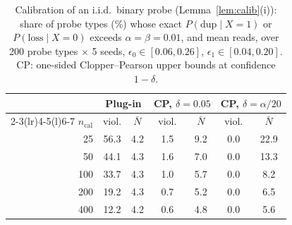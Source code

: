 \begin{table}[!htbp]
\centering
\caption{Calibration of an i.i.d.\ binary probe (Lemma~\ref{lem:calib}(i)): share of probe types (\%) whose exact $P(\mathrm{dup}\mid X{=}1)$ or
$P(\mathrm{loss}\mid X{=}0)$ exceeds $\alpha{=}\beta{=}0.01$, and mean reads, over 200 probe types $\times$ 5 seeds, $\epsilon_0{\in}[0.06,0.26]$,
$\epsilon_1{\in}[0.04,0.20]$. CP: one-sided Clopper--Pearson upper bounds at confidence $1{-}\delta$.}
\label{tab:calib}
\footnotesize
\setlength{\tabcolsep}{3.5pt}
\begin{tabular}{@{}r cc cc cc@{}}
\toprule
 & \multicolumn{2}{c}{Plug-in} & \multicolumn{2}{c}{CP, $\delta{=}0.05$} & \multicolumn{2}{c}{CP, $\delta{=}\alpha/20$} \\
\cmidrule(lr){2-3}\cmidrule(lr){4-5}\cmidrule(l){6-7}
$n_{\mathrm{cal}}$ & viol. & $\bar N$ & viol. & $\bar N$ & viol. & $\bar N$ \\
\midrule
25 & 56.3 & 4.2 & 1.5 & 9.2 & 0.0 & 22.9 \\
50 & 44.1 & 4.3 & 1.6 & 7.0 & 0.0 & 13.3 \\
100 & 33.7 & 4.3 & 1.0 & 5.7 & 0.0 & 8.2 \\
200 & 19.2 & 4.3 & 0.7 & 5.2 & 0.0 & 6.5 \\
400 & 12.2 & 4.2 & 0.6 & 4.8 & 0.0 & 5.6 \\
\bottomrule
\end{tabular}
\end{table}
